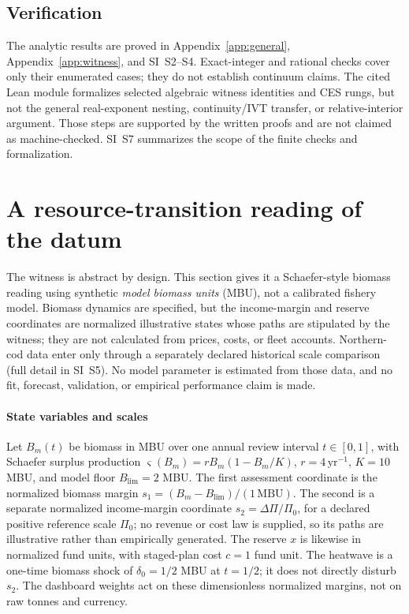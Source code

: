 \documentclass[preprint,11pt,authoryear]{elsarticle}
\theoremstyle{definition}
\theoremstyle{remark}
\begin{document}
\subsection{Verification}\label{sec:verification}

The analytic results are proved in Appendix~\ref{app:general}, Appendix~\ref{app:witness}, and SI~S2--S4. Exact-integer and rational checks cover only their enumerated cases; they do not establish continuum claims. The cited Lean module formalizes selected algebraic witness identities and CES rungs, but not the general real-exponent nesting, continuity/IVT transfer, or relative-interior argument. Those steps are supported by the written proofs and are not claimed as machine-checked. SI~S7 summarizes the scope of the finite checks and formalization.

\section{A resource-transition reading of the datum}\label{sec:benchmark}

The witness is abstract by design. This section gives it a Schaefer-style biomass reading using synthetic \emph{model biomass units} (MBU), not a calibrated fishery model. Biomass dynamics are specified, but the income-margin and reserve coordinates are normalized illustrative states whose paths are stipulated by the witness; they are not calculated from prices, costs, or fleet accounts. Northern-cod data enter only through a separately declared historical scale comparison (full detail in SI~S5). No model parameter is estimated from those data, and no fit, forecast, validation, or empirical performance claim is made.

\paragraph{State variables and scales} Let $B_m(t)$ be biomass in MBU over one annual review interval $t\in[0,1]$, with Schaefer surplus production $\varsigma(B_m)=rB_m(1-B_m/K)$, $r=4\,\mathrm{yr}^{-1}$, $K=10$ MBU, and model floor $B_{\mathrm{lim}}=2$ MBU. The first assessment coordinate is the normalized biomass margin $s_1=(B_m-B_{\mathrm{lim}})/(1\,\mathrm{MBU})$. The second is a separate normalized income-margin coordinate $s_2=\Delta\Pi/\Pi_0$, for a declared positive reference scale $\Pi_0$; no revenue or cost law is supplied, so its paths are illustrative rather than empirically generated. The reserve $x$ is likewise in normalized fund units, with staged-plan cost $c=1$ fund unit. The heatwave is a one-time biomass shock of $\delta_0=1/2$ MBU at $t=1/2$; it does not directly disturb $s_2$. The dashboard weights act on these dimensionless normalized margins, not on raw tonnes and currency.
\end{document}
